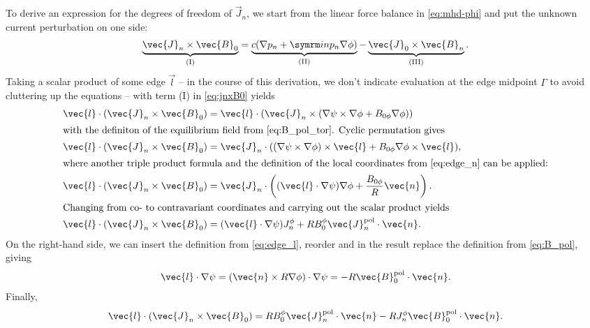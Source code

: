 To derive an expression for the degrees of freedom of $\vec{J}_{n}$, we start from the linear force balance in \cref{eq:mhd-phi} and put the unknown current perturbation on one side:
\begin{gather}
  \underbrace{\vec{J}_{n} \times \vec{B}_{0}}_{\text{(I)}} = \underbrace{c (\grad p_{n} + \im n p_{n} \grad \phi)}_{\text{(II)}} - \underbrace{\vec{J}_{0} \times \vec{B}_{n}}_{\text{(III)}}. \label{eq:jnxB0}
\end{gather}
Taking a scalar product of some edge $\vec{l}$ -- in the course of this derivation, we don't indicate evaluation at the edge midpoint $\Gamma$ to avoid cluttering up the equations -- with term (I) in \cref{eq:jnxB0} yields
\begin{align}
  \vec{l} \cdot (\vec{J}_{n} \times \vec{B}_{0}) &= \vec{l} \cdot (\vec{J}_{n} \times (\grad \psi \times \grad \phi + B_{0 \phi} \grad \phi)) \\
  \intertext{with the definiton of the equilibrium field from \cref{eq:B_pol_tor}. Cyclic permutation gives}
  \vec{l} \cdot (\vec{J}_{n} \times \vec{B}_{0}) &= \vec{J}_{n} \cdot ((\grad \psi \times \grad \phi) \times \vec{l} + B_{0 \phi} \grad \phi \times \vec{l}), \\
  \intertext{where another triple product formula and the definition of the local coordinates from \cref{eq:edge_n} can be applied:}
  \vec{l} \cdot (\vec{J}_{n} \times \vec{B}_{0}) &= \vec{J}_{n} \cdot \left ( (\vec{l} \cdot \grad \psi) \grad \phi + \frac{B_{0 \phi}}{R} \vec{n} \right ). \\
  \intertext{Changing from co- to contravariant coordinates and carrying out the scalar product yields}
  \vec{l} \cdot (\vec{J}_{n} \times \vec{B}_{0}) &= (\vec{l} \cdot \grad \psi) J_{n}^{\phi} + R B_{0}^{\phi} \vec{J}_{n}^{\pol} \cdot \vec{n}.
\end{align}
On the right-hand side, we can insert the definition from \cref{eq:edge_l}, reorder and in the result replace the definition from \cref{eq:B_pol}, giving
\begin{gather}
  \vec{l} \cdot \grad \psi = \left( \vec{n} \times R \grad \phi \right) \cdot \grad \psi = -R \vec{B}_{0}^{\pol} \cdot \vec{n}. \label{eq:l_grad_psi}
\end{gather}
Finally,
\begin{gather}
  \vec{l} \cdot (\vec{J}_{n} \times \vec{B}_{0}) = R B_{0}^{\phi} \vec{J}_{n}^{\pol} \cdot \vec{n} - R J_{n}^{\phi} \vec{B}_{0}^{\pol} \cdot \vec{n}. \label{eq:jnxB0_I}
\end{gather}
